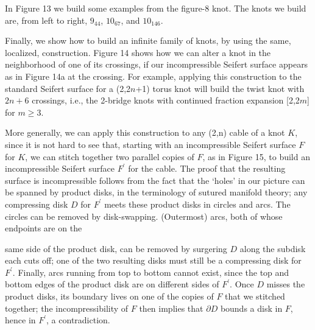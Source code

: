 In Figure 13 we build some examples from the figure-8 knot. 
The knots we build are, from left to right, $9_{44}$, $10_{67}$, and $10_{146}$.

Finally, we show how to build an infinite family of knots, by using the 
same, localized, construction. Figure 14 shows how we can alter a knot
in the neighborhood of one of its crossings, if our incompressible Seifert
surface appears as in Figure 14a at the crossing. For example, applying this
construction to the standard Seifert surface for a (2,2$n$+1) torus knot will
build the twist knot with $2n+6$ crossings, i.e., the 2-bridge knots with
continued fraction expansion [2,2$m$] for $m\geq 3$.

More generally, we can apply this construction to any (2,n) cable of a knot $K$, 
since it is not hard to see that, starting with an incompressible Seifert surface
$F$ for $K$, we can stitch together two parallel copies of $F$, as in Figure 15, to build an 
incompressible Seifert surface $F^\prime$ for the cable. The proof that the resulting 
surface is incompressible follows from the fact that the `holes' in our picture can
be spanned by product disks, in the terminology of sutured manifold theory; any
compressing disk $D$ for $F^\prime$ meets these product disks in circles and arcs. 
The circles can be removed by disk-swapping. (Outermost) arcs, both of whose endpoints 
are on the 


\smallskip

\leavevmode

\epsfxsize=3.6in

\centerline{{}}


\smallskip

\noindent same side of the product disk, can be removed by surgering $D$ along the 
subdisk each cuts off; one of the two resulting disks must still be a compressing
disk for $F^\prime$. Finally, arcs running from top to bottom cannot exist, since 
the top and bottom 
edges of the product disk are on different sides of $F^\prime$. Once $D$ misses the
product disks, its boundary lives on one of the copies of $F$ that we stitched together;
the incompressibility of $F$ then implies that $\partial D$ bounds a disk in $F$, hence
in $F^\prime$, a contradiction.


\smallskip

\leavevmode

\epsfxsize=4.9in

\centerline{{}}

